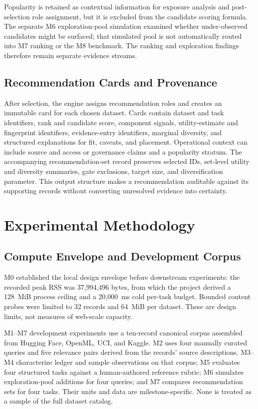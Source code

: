 \documentclass[conference]{IEEEtran}
\begin{document}
Popularity is retained as contextual information for exposure analysis and post-selection role assignment, but it is excluded from the candidate scoring formula. The separate M6 exploration-pool simulation examined whether under-observed candidates might be surfaced; that simulated pool is not automatically routed into M7 ranking or the M8 benchmark. The ranking and exploration findings therefore remain separate evidence streams.

\subsection{Recommendation Cards and Provenance}
After selection, the engine assigns recommendation roles and creates an immutable card for each chosen dataset. Cards contain dataset and task identifiers, rank and candidate score, component signals, utility-estimate and fingerprint identifiers, evidence-entry identifiers, marginal diversity, and structured explanations for fit, caveats, and placement. Operational context can include source and access or governance claims and a popularity stratum. The accompanying recommendation-set record preserves selected IDs, set-level utility and diversity summaries, gate exclusions, target size, and diversification parameter. This output structure makes a recommendation auditable against its supporting records without converting unresolved evidence into certainty.

\section{Experimental Methodology}
\subsection{Compute Envelope and Development Corpus}
M0 established the local design envelope before downstream experiments: the recorded peak RSS was 37{,}994{,}496 bytes, from which the project derived a 128~MiB process ceiling and a 20{,}000~ms cold per-task budget. Bounded content probes were limited to 32 records and 64~MiB per dataset. These are design limits, not measures of web-scale capacity.

M1--M7 development experiments use a ten-record canonical corpus assembled from Hugging Face, OpenML, UCI, and Kaggle. M2 uses four manually curated queries and five relevance pairs derived from the records' source descriptions. M3--M4 characterize ledger and sample observations on that corpus; M5 evaluates four structured tasks against a human-authored reference rubric; M6 simulates exploration-pool additions for four queries; and M7 compares recommendation sets for four tasks. Their units and data are milestone-specific. None is treated as a sample of the full dataset catalog.
\end{document}
